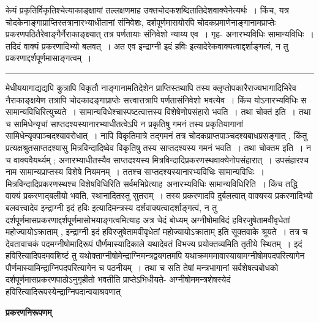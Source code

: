 \documentclass[11pt, openany]{book}
\begin{document}
 केयं प्रकृतिर्विकृतिश्चेत्याकाङ्क्षायां तल्लक्षणमाह उक्तचोदकशब्दितातिदेशवाक्येनेत्यर्थः~। किंच, यत्र
चोदकेनाङ्गाप्राप्तिस्तत्रानारभ्याधीतानां संनिवेशः, दर्शपूर्णमासयोरपि चोदकप्रमाणेनाङ्गानामप्राप्तेः प्रकरणपठितैरेवाङ्गैर्नैराकाङ्क्ष्यात् तत्र पर्णतायाः संनिवेशो न्याय्य एव~। गृह-
\newpage
\fancyhead[RE]{[प्रकृतिविकृतिलक्षणम् ]}
{\bl\noindent अनारभ्यविधिः सामान्यविधिः~। तदिदं वाक्यं प्रकरणादिभ्यो बलवत्~। अत एव {\qtl इन्द्राग्नी इदं हविः} इत्यादेरेकवाक्यत्वाद्दर्शाङ्गत्वं, न तु प्रकरणाद्दर्शपूर्णमासाङ्गत्वम्~।}\\
\hrule
\vspace{3mm}
\noindent
मेधीययागाद्यद्यपि कुत्रापि विकृतौ नाङ्गानामतिदेशेन प्राप्तिस्तथापि तस्य क्लृप्तोपकारैराज्यभागादिभिरेव नैराकाङ्क्षयेण तत्रापि चोदकादङ्गाप्राप्तेः सत्त्वात्तत्रापि पर्णतासंनिवेशो भवत्येव~। किंच योऽनारभ्यविधिः स सामान्यविधिरित्युच्यते~। सामान्यविधेश्चास्पष्टत्वात्तस्य विशेषेणोपसंहारो भवति~। तथा चोक्तं  इति~। तथा च सामिधेन्यृचां साप्तदश्यस्यानारभ्याधीतत्वेऽपि न प्रकृतिषु गमनं तस्य प्रकृतियागानां सामिधेन्यृक्पाञ्चदश्यावरोधात्~। नापि विकृतिमात्रे तद्गमनं तत्र चोदकप्राप्तपाञ्चदश्यबाधप्रसङ्गात् , किंतु प्रत्यक्षश्रुतसाप्तदश्यासु मित्रविन्दादिष्वेव विकृतिषु तस्य साप्तदश्यस्य गमनं भवति~। तथा चोक्तम  इति~। न च वाक्यवैयर्थ्यम् ; अनारभ्याधीतस्यैव साप्तदश्यस्य मित्रविन्दादिप्रकरणस्थवाक्येनोपसंहारात्~। उपसंहारश्च नाम सामान्यप्राप्तस्य विशेषे नियमनम्~। ततश्च साप्तदश्यस्यानारभ्यविधिः सामान्यविधिः~। मित्रविन्दादिप्रकरणस्थश्च विशेषविधिरिति सर्वमभिप्रेत्याह\textendash\ {\br अनारभ्यविधिः सामान्यविधिरिति~।} किंच तद्धि वाक्यं प्रकरणाद्बलीयो भवति, स्थानादितस्तु सुतराम्~। तस्य प्रकरणादपि दुर्बलत्वात् वाक्यस्य प्रकरणादिभ्यो बलवत्त्वादेव {\qt इन्द्राग्नी इदं हविः} इत्यादिमन्त्रस्य दर्शवाक्यत्वादर्शाङ्गत्वं, न तु दर्शपूर्णमासप्रकरणाद्दर्शपूर्णमासोभयाङ्गत्वमित्याह \noindent अत्र \textendash चेदं बोध्यम् {\qt अग्नीषोमाविदं हविरजुषेतामवीवृधेतां महोज्यायोऽक्राताम् , इन्द्राग्नी इदं हविरजुषेतामवीवृधेतां महोज्यायोऽक्राताम्} इति सूक्तवाके श्रूयते~। तत्र च देवतावाचकं पदमग्नीषोमादिरूपं पौर्णमास्यादिकाले यथादेवतं विभज्य प्रयोक्तव्यमिति {\br तृतीये} स्थितम्~। इदं हविरित्यादिपदमवशिष्टं तु यथोक्ताग्नीषोमेन्द्राग्निमन्त्रद्वयगतमपि यथाक्रमममावास्यायामग्नीषोमपदपरित्यागेन पौर्णमास्यामिन्द्राग्निपदपरित्यागेन च पठनीयम्~। तथा च सति तेषां मन्त्रभागानां सर्वशेषत्वबोधको दर्शपूर्णमासप्रकरणपाठोऽनुगृहीतो भवतीति प्राप्तेऽभिधीयते- अग्नीषोममन्त्रशेषस्येदं हविरित्यादिरूपस्येन्द्राग्निपदान्वयाश्रवणात्
\newpage
\fancyhead[LO]{[महाप्रकरणम्]}
 \begin{center}
\textbf{प्रकरणनिरूपणम् }     
 \end{center}
\end{document}
